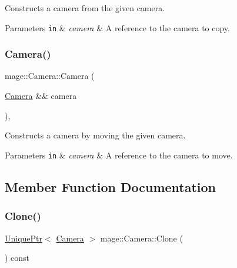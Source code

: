 Constructs a camera from the given camera.


\begin{DoxyParams}[1]{Parameters}
\mbox{\tt in}  & {\em camera} & A reference to the camera to copy. \\
\hline
\end{DoxyParams}
\hypertarget{classmage_1_1_camera_a4dc6f31c108b28abe9580ef6d7a06713}{}\label{classmage_1_1_camera_a4dc6f31c108b28abe9580ef6d7a06713} 
\subsubsection{\texorpdfstring{Camera()}{Camera()}\hspace{0.1cm}{\footnotesize\ttfamily [3/3]}}
{\footnotesize\ttfamily mage\+::\+Camera\+::\+Camera (\begin{DoxyParamCaption}\item[{\hyperlink{classmage_1_1_camera}{Camera} \&\&}]{camera }\end{DoxyParamCaption})\hspace{0.3cm}{\ttfamily [protected]}, {\ttfamily [default]}}

Constructs a camera by moving the given camera.


\begin{DoxyParams}[1]{Parameters}
\mbox{\tt in}  & {\em camera} & A reference to the camera to move. \\
\hline
\end{DoxyParams}


\subsection{Member Function Documentation}
\hypertarget{classmage_1_1_camera_a830e9a071449f1026fd43fcd19577e6c}{}\label{classmage_1_1_camera_a830e9a071449f1026fd43fcd19577e6c} 
\subsubsection{\texorpdfstring{Clone()}{Clone()}}
{\footnotesize\ttfamily \hyperlink{namespacemage_a8c307fbcc33bce9b7f2aa4c26c3b95cf}{Unique\+Ptr}$<$ \hyperlink{classmage_1_1_camera}{Camera} $>$ mage\+::\+Camera\+::\+Clone (\begin{DoxyParamCaption}{ }\end{DoxyParamCaption}) const}

